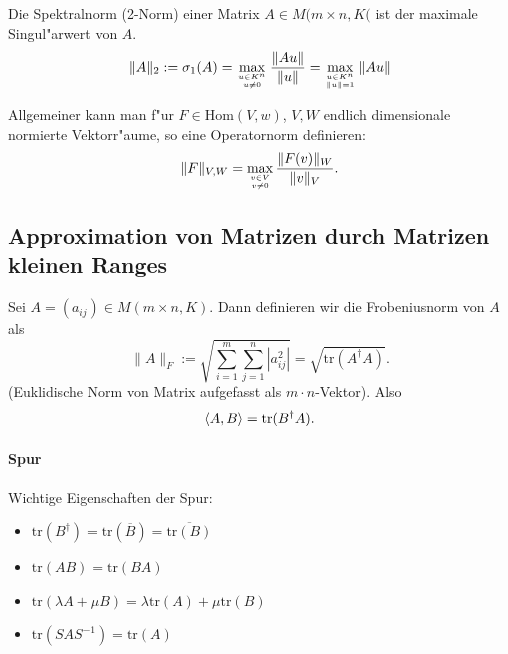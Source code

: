 \documentclass[11pt, a4paper]{article}
\begin{document}
\begin{definition}
Die Spektralnorm (2-Norm) einer Matrix $A \in M(m \times n, K($ ist der maximale Singul"arwert von $A$.
$$
\|A\|_{2}:=\sigma_{1}(A)=\max _{u \in K^n \atop u \neq 0} \frac{\|A u\|}{\|u\|}=\max _{u \in K^n \atop \|u\|=1}\|A u\|
$$
\end{definition}

\begin{remark}
Allgemeiner kann man f"ur $F \in \mathrm{Hom}(V, w)$, $V, W$ endlich dimensionale normierte Vektorr"aume, so eine Operatornorm definieren:
$$
\|F\|_{V, W} = \max\limits_{ v \in V \atop v \neq 0} \frac{\|F(v)\|_W}{\|v\|_V}.
$$
\end{remark}



\subsection{Approximation von Matrizen durch Matrizen kleinen Ranges}
\begin{definition}
Sei $A = (a_{ij}) \in M( m \times n, K)$. Dann definieren wir die Frobeniusnorm von $A$ als
$$
\|A\|_F := \sqrt{\sum\limits_{i = 1}^m \sum\limits_{j = 1}^n |a_{ij}^2|} = \sqrt{\mathrm{tr}(A^\dagger A)}.
$$
(Euklidische Norm von Matrix aufgefasst als $m \cdot n$-Vektor). Also
$$
\left\langle {A} , {B} \right\rangle = \mathrm{tr}(B^\dagger A).
$$
\end{definition}

\paragraph{Spur}
\begin{remark}
Wichtige Eigenschaften der Spur:
\begin{itemize}
\item $\mathrm{tr}(B^\dagger) = \mathrm{tr}(\overline{B}) = \overline{\mathrm{tr}({B})}$
\item $\mathrm{tr}(AB) = \mathrm{tr}(BA)$
\item $\mathrm{tr}(\lambda A + \mu B) = \lambda \mathrm{tr}(A )+ \mu \mathrm{tr}(B)$
\item $\mathrm{tr}(S A S^{-1}) = \mathrm{tr}(A)$
\end{itemize}

\end{remark}
\end{document}
